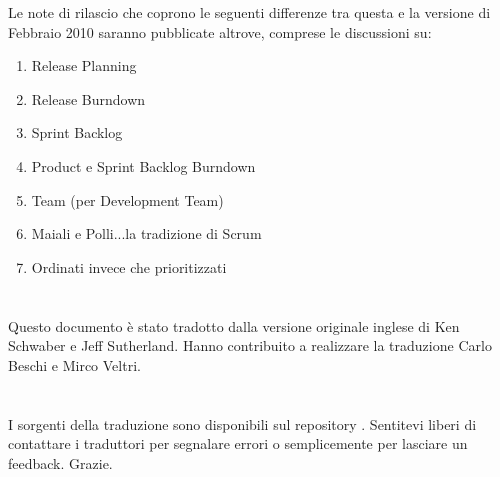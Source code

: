 Le note di rilascio che coprono le seguenti differenze tra questa e la versione di Febbraio 2010 saranno pubblicate altrove, comprese le discussioni su:

\begin{enumerate}
 	\item Release Planning
	\item Release Burndown
	\item Sprint Backlog
	\item Product e Sprint Backlog Burndown
	\item Team (per Development Team)
	\item Maiali e Polli...la tradizione di Scrum
	\item Ordinati invece che prioritizzati 
\end{enumerate}

\newpage
\section*{\color{Blue}{Traduzione}}
\label{sec:translation}
Questo documento \`e stato tradotto dalla versione originale inglese di Ken Schwaber e Jeff Sutherland. Hanno contribuito a realizzare la traduzione Carlo Beschi e Mirco Veltri.

\section*{\color{Blue}{Note alla versione italiana}}
\label{sec:transnotes}
I sorgenti della traduzione sono disponibili sul repository . 
Sentitevi liberi di contattare i traduttori per segnalare errori o semplicemente per lasciare un feedback. Grazie.

